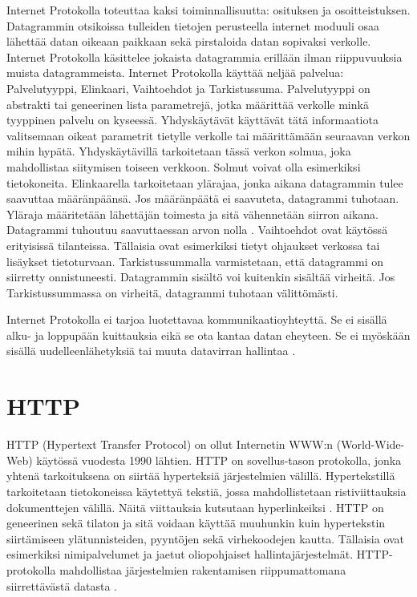 \documentclass[utf8]{gradu3}
\begin{document}
Internet Protokolla toteuttaa kaksi toiminnallisuutta: osituksen ja osoitteistuksen. Datagrammin otsikoissa tulleiden tietojen perusteella internet moduuli osaa lähettää datan oikeaan paikkaan sekä pirstaloida datan sopivaksi verkolle. Internet Protokolla käsittelee jokaista datagrammia erillään ilman riippuvuuksia muista datagrammeista. Internet Protokolla käyttää neljää palvelua: Palvelutyyppi, Elinkaari, Vaihtoehdot ja Tarkistussuma. Palvelutyyppi on abstrakti tai geneerinen lista parametrejä, jotka määrittää verkolle minkä tyyppinen palvelu on kyseessä. Yhdyskäytävät käyttävät tätä informaatiota valitsemaan oikeat parametrit tietylle verkolle tai määrittämään seuraavan verkon mihin hypätä. Yhdyskäytävillä tarkoitetaan tässä verkon solmua, joka mahdollistaa siitymisen toiseen verkkoon. Solmut voivat olla esimerkiksi tietokoneita. Elinkaarella tarkoitetaan ylärajaa, jonka aikana datagrammin tulee saavuttaa määränpäänsä. Jos määränpäätä ei saavuteta, datagrammi tuhotaan. Yläraja määritetään lähettäjän toimesta ja sitä vähennetään siirron aikana. Datagrammi tuhoutuu saavuttaessan arvon nolla \cite{internet_protocol}. Vaihtoehdot ovat käytössä erityisissä tilanteissa. Tällaisia ovat esimerkiksi tietyt ohjaukset verkossa tai lisäykset tietoturvaan. Tarkistussummalla varmistetaan, että datagrammi on siirretty onnistuneesti. Datagrammin sisältö voi kuitenkin sisältää virheitä. Jos Tarkistussummassa on virheitä, datagrammi tuhotaan välittömästi. 

Internet Protokolla ei tarjoa luotettavaa kommunikaatioyhteyttä. Se ei sisällä alku- ja loppupään kuittauksia eikä se ota kantaa datan eheyteen. Se ei myöskään sisällä uudelleenlähetyksiä tai muuta datavirran hallintaa \cite{internet_procotol}.
\section{HTTP}
HTTP (Hypertext Transfer Protocol) on ollut Internetin WWW:n (World-Wide-Web) käytössä vuodesta 1990 lähtien. HTTP on sovellus-tason protokolla, jonka yhtenä tarkoituksena on siirtää hyperteksiä järjestelmien välillä. Hypertekstillä tarkoitetaan tietokoneissa käytettyä tekstiä, jossa mahdollistetaan ristiviittauksia dokumenttejen välillä. Näitä viittauksia kutsutaan hyperlinkeiksi \cite{hypertext}.   HTTP on geneerinen sekä tilaton ja sitä voidaan käyttää muuhunkin kuin hypertekstin siirtämiseen ylätunnisteiden, pyyntöjen sekä virhekoodejen kautta. Tällaisia ovat esimerkiksi nimipalvelumet ja jaetut oliopohjaiset hallintajärjestelmät. HTTP-protokolla mahdollistaa järjestelmien rakentamisen riippumattomana siirrettävästä datasta \cite{http}.
\end{document}
